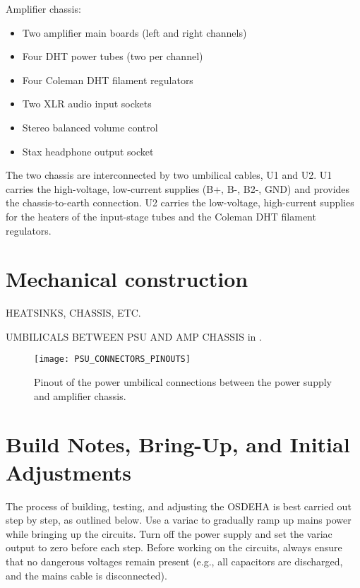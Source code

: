 Amplifier chassis:
\begin{itemize}
\item Two amplifier main boards (left and right channels)
\item Four DHT power tubes (two per channel)
\item Four Coleman DHT filament regulators
\item Two XLR audio input sockets
\item Stereo balanced volume control
\item Stax headphone output socket
\end{itemize}

The two chassis are interconnected by two umbilical cables, U1 and U2. U1 carries the high-voltage, low-current supplies (B+, B-, B2-, GND) and provides the chassis-to-earth connection. U2 carries the low-voltage, high-current supplies for the heaters of the input-stage tubes and the Coleman DHT filament regulators.


\section{Mechanical construction}

HEATSINKS, CHASSIS, ETC.

UMBILICALS BETWEEN PSU AND AMP CHASSIS in .

\begin{figure}
\begin{center}
\texttt{[image: PSU\_CONNECTORS\_PINOUTS]}
\caption{Pinout of the power umbilical connections between the power supply and amplifier chassis.}
\end{center}
\end{figure}


\section{Build Notes, Bring-Up, and Initial Adjustments}

The process of building, testing, and adjusting the OSDEHA is best carried out step by step, as outlined below. Use a variac to gradually ramp up mains power while bringing up the circuits. Turn off the power supply and set the variac output to zero before each step. Before working on the circuits, always ensure that no dangerous voltages remain present (e.g., all capacitors are discharged, and the mains cable is disconnected).

